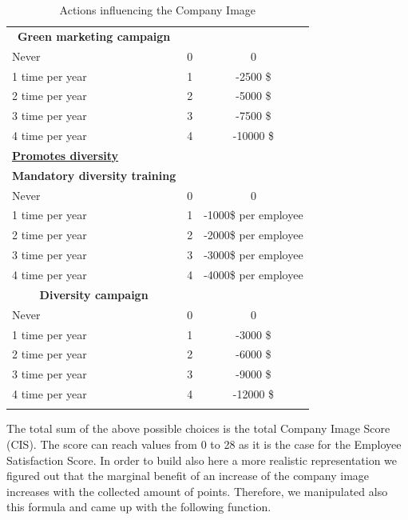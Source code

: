 \begin{longtable}[]{l|c|c}
     \multicolumn{1}{c|}{\textbf{Green marketing campaign}} & & \\
     Never & 0 & 0 \\
     1 time per year & 1 & -2500 \$  \\
     2 time per year & 2 & -5000 \$  \\
     3 time per year & 3 & -7500 \$  \\
     4 time per year & 4 & -10000 \$  \\
     \hline \hline
     \underline{\textbf{Promotes diversity}} & & \\ [1ex]
     \multicolumn{1}{c|}{\textbf{Mandatory diversity training}} & & \\
     Never & 0 & 0 \\
     1 time per year & 1 & -1000\$ per employee  \\
     2 time per year & 2 & -2000\$ per employee  \\
     3 time per year & 3 & -3000\$ per employee  \\
     4 time per year & 4 & -4000\$ per employee  \\
     \multicolumn{1}{c|}{\textbf{Diversity campaign}} & & \\
     Never & 0 & 0 \\
     1 time per year & 1 & -3000 \$  \\
     2 time per year & 2 & -6000 \$  \\
     3 time per year & 3 & -9000 \$  \\
     4 time per year & 4 & -12000 \$  \\
     \hline 
\caption{Actions influencing the Company Image}
    \label{tab:benefitsCIS}
\end{longtable}

The total sum of the above possible choices is the total Company Image Score (CIS). The score can reach values from 0 to 28 as it is the case for the Employee Satisfaction Score. In order to build also here a more realistic representation we figured out that the marginal benefit of an increase of the company image increases with the collected amount of points. Therefore, we manipulated also this formula and came up with the following function.


